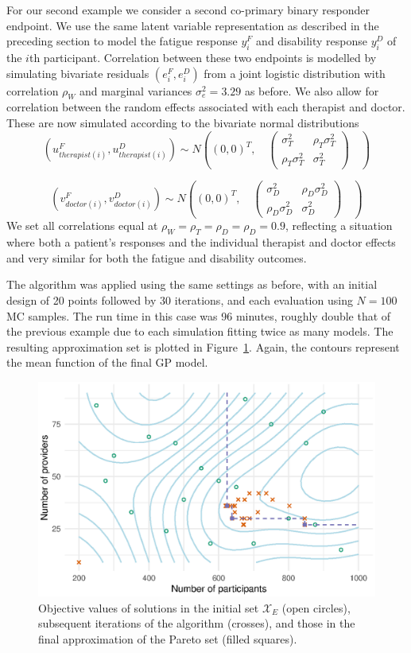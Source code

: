 \documentclass[sagev]{sagej}
\begin{document}
For our second example we consider a second co-primary binary responder endpoint. We use the same latent variable representation as described in the preceding section to model the fatigue response $y_i^F$ and disability response $y_i^D$ of the $i$th participant. Correlation between these two endpoints is modelled by simulating bivariate residuals $(e_i^F, e_i^D)$ from a joint logistic distribution with correlation $\rho_W$ and marginal variances $\sigma_e^2 = 3.29$ as before. We also allow for correlation between the random effects associated with each therapist and doctor. These are now simulated according to the bivariate normal distributions
$$
(u_{therapist(i)}^F, u_{therapist(i)}^D) \sim N\left( (0,0)^T, \quad
\begin{pmatrix} 
\sigma_T^2 & \rho_T \sigma_T^2 \\
\rho_T \sigma_T^2  & \sigma_T^2 
\end{pmatrix}
\quad \right)
$$

$$
(v_{doctor(i)}^F, v_{doctor(i)}^D) \sim N\left( (0,0)^T, \quad
\begin{pmatrix} 
\sigma_D^2  & \rho_D \sigma_D^2  \\
\rho_D \sigma_D^2  & \sigma_D^2 
\end{pmatrix}
\quad \right)
$$
We set all correlations equal at $\rho_W = \rho_T = \rho_D = \rho_D = 0.9$, reflecting a situation where both a patient's responses and the individual therapist and doctor effects and very similar for both the fatigue and disability outcomes. 

The algorithm was applied using the same settings as before, with an initial design of 20 points followed by 30 iterations, and each evaluation using $N = 100$ MC samples. The run time in this case was 96 minutes, roughly double that of the previous example due to each simulation fitting twice as many models. The resulting approximation set is plotted in Figure~\ref{fig:ex2_single_run}. Again, the contours represent the mean function of the final GP model. 

\begin{figure}
\centering
\includegraphics[scale=0.8]{./figures/ex2_single_run.eps}
\caption{Objective values of solutions in the initial set $\mathcal{X}_{E}$ (open circles), subsequent iterations of the algorithm (crosses), and those in the final approximation of the Pareto set (filled squares).}
\label{fig:ex2_single_run}
\end{figure}
\end{document}
